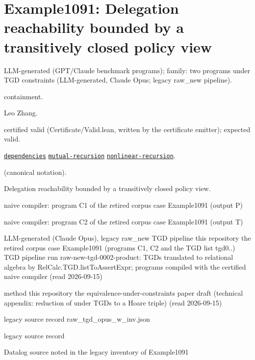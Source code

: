 \documentclass[10pt]{article}
\begin{document}
\Needspace{0.45\textheight}

\section{Example1091: Delegation reachability bounded by a transitively closed policy view}\label{case:Example1091}

\begin{description}[leftmargin=2.6cm,style=nextline,itemsep=1pt]

\item[Category] LLM-generated (GPT/Claude benchmark programs); family: two programs under TGD constraints (LLM-generated, Claude Opus; legacy raw\_new pipeline).

\item[Kind] containment.

\item[Contributors] Leo Zhang.

\item[Status] certified valid (Certificate/Valid.lean, written by the certificate emitter); expected valid.

\item[Tags] \hyperref[tag:dependencies]{\texttt{dependencies}} \hyperref[tag:mutual-recursion]{\texttt{mutual-recursion}} \hyperref[tag:nonlinear-recursion]{\texttt{nonlinear-recursion}}.

\item[Input]  (canonical notation).

\item[Summary] Delegation reachability bounded by a transitively closed policy view.

\item[Sides] naive compiler: program C1 of the retired corpus case Example1091 (output P) \par naive compiler: program C2 of the retired corpus case Example1091 (output T)

\item[Sources] {\raggedright LLM-generated (Claude Opus), legacy raw\_new TGD pipeline this repository the retired corpus case Example1091 (programs C1, C2 and the TGD list tgd0..) TGD pipeline run raw-new-tgd-0002-product: TGDs translated to relational algebra by RelCalc.TGD.listToAssertExpr; programs compiled with the certified naive compiler (read 2026-09-15) \par method this repository the equivalence-under-constraints paper draft (technical appendix: reduction of  under TGDs to a Hoare triple) (read 2026-09-15) \par legacy source record raw\_tgd\_opus\_w\_inv.json \par legacy source record  \par Datalog source noted in the legacy inventory of Example1091\par}


\end{description}
\end{document}
